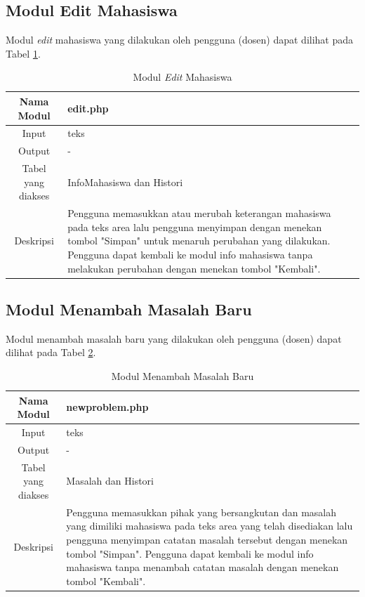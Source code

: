 \subsection{Modul Edit Mahasiswa}
Modul {\it edit} mahasiswa yang dilakukan oleh pengguna (dosen) dapat dilihat
pada Tabel \ref{tab:moduleditmahasiswa}.

\begin{table}[ht]
\centering
\caption[Tabel Modul {\it Edit} Mahasiswa]{Modul {\it Edit} Mahasiswa}
\label{tab:moduleditmahasiswa}
\begin{tabular}{|c|p{10cm}|}
\hline
Nama Modul & edit.php\\
\hline
Input & teks\\
\hline
Output & -\\
\hline
Tabel yang diakses & InfoMahasiswa dan Histori\\
\hline
Deskripsi & Pengguna memasukkan atau merubah keterangan mahasiswa pada teks area lalu pengguna menyimpan dengan menekan tombol "Simpan" untuk menaruh perubahan yang dilakukan. Pengguna dapat kembali ke modul info mahasiswa tanpa melakukan perubahan dengan menekan tombol "Kembali".\\
\hline
\end{tabular}
\end{table}

\subsection{Modul Menambah Masalah Baru}
Modul menambah masalah baru yang dilakukan oleh pengguna (dosen) dapat dilihat pada Tabel \ref{tab:modulmasalahbaru}.

\begin{table}[ht]
\centering
\caption[Tabel Modul Menambah Masalah Baru]{Modul Menambah Masalah Baru}
\label{tab:modulmasalahbaru}
\begin{tabular}{|c|p{10cm}|}
\hline
Nama Modul & newproblem.php\\
\hline
Input & teks\\
\hline
Output & -\\
\hline
Tabel yang diakses & Masalah dan Histori\\
\hline
Deskripsi & Pengguna memasukkan pihak yang bersangkutan dan masalah yang dimiliki mahasiswa pada teks area yang telah disediakan lalu pengguna menyimpan catatan masalah tersebut dengan menekan tombol "Simpan". Pengguna dapat kembali ke modul info mahasiswa tanpa menambah catatan masalah dengan menekan tombol "Kembali".\\
\hline
\end{tabular}
\end{table}

